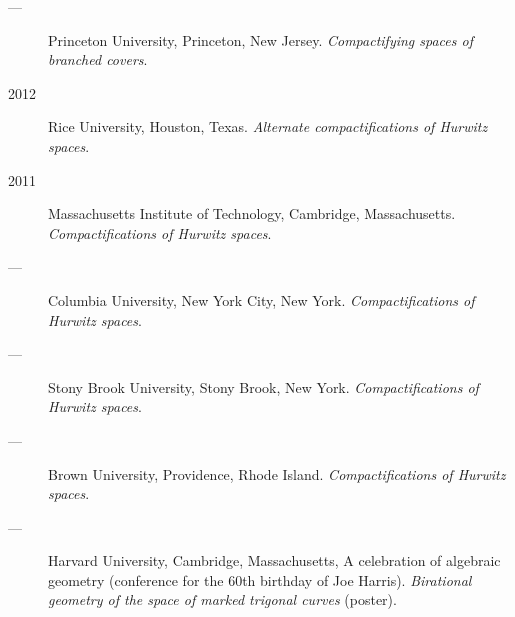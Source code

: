 \documentclass[11pt]{article}
\begin{document}
\begin{description}
\item[{---}] Princeton University, Princeton, New Jersey. \emph{Compactifying spaces of branched covers}.
\item[{2012}] Rice University, Houston, Texas. \emph{Alternate compactifications of Hurwitz spaces}.
\item[{2011}] Massachusetts Institute of Technology, Cambridge, Massachusetts. \emph{Compactifications of Hurwitz spaces}.
\item[{---}] Columbia University, New York City, New York. \emph{Compactifications of Hurwitz spaces}.
\item[{---}] Stony Brook University, Stony Brook, New York. \emph{Compactifications of Hurwitz spaces}.
\item[{---}] Brown University, Providence, Rhode Island. \emph{Compactifications of Hurwitz spaces}.
\item[{---}] Harvard University, Cambridge, Massachusetts, A celebration of algebraic geometry (conference for the 60th birthday of Joe Harris). \emph{Birational geometry of the space of marked trigonal curves} (poster).
\end{description}
\end{document}
